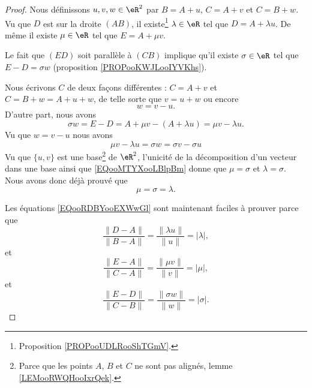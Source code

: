 \begin{proof}
	Nous définissons \( u,v,w\in \eR^2\) par \( B=A+u\), \( C=A+v\) et \( C=B+w\). Vu que \( D\) est sur la droite \( (AB)\), il existe\footnote{Proposition \ref{PROPooUDLRooShTGmV}.} \( \lambda\in \eR\) tel que \( D=A+\lambda u\). De même il existe \( \mu\in \eR\) tel que \( E=A+\mu v\).

	Le fait que \( (ED)\) soit parallèle à \( (CB)\) implique qu'il existe \( \sigma\in \eR\) tel que \( E-D=\sigma w\) (proposition \ref{PROPooKWJLooIYVKhs}).

	Nous écrivons \( C\) de deux façons différentes : \( C=A+v\) et \( C=B+w=A+u+w\), de telle sorte que \( v=u+w\) ou encore
	\begin{equation}
		w=v-u.
	\end{equation}
	D'autre part, nous avons
	\begin{equation}
		\sigma w=E-D=A+\mu v-(A+\lambda u)=\mu v-\lambda u.
	\end{equation}
	Vu que \( w=v-u\) nous avons
	\begin{equation}		\label{EQooMTYXooLBlpBm}
		\mu v-\lambda u=\sigma w=\sigma v-\sigma u
	\end{equation}
	Vu que \( \{ u,v \}\) est une base\footnote{Parce que les points \( A\), \( B\) et \( C\) ne sont pas alignés, lemme \ref{LEMooRWQHooIxrQek}.} de \( \eR^2\), l'unicité de la décomposition d'un vecteur dans une base ainsi que \ref{EQooMTYXooLBlpBm} donne que \( \mu=\sigma\) et \( \lambda=\sigma\). Nous avons donc déjà prouvé que
	\begin{equation}
		\mu=\sigma=\lambda.
	\end{equation}

	Les équations \eqref{EQooRDBYooEXWwGl} sont maintenant faciles à prouver parce que
	\begin{equation}
		\frac{ \| D-A \| }{ \| B-A \| }=\frac{ \| \lambda u \| }{ \| u \| }=| \lambda |,
	\end{equation}
	et
	\begin{equation}
		\frac{ \| E-A \| }{ \| C-A \| }=\frac{ \| \mu v \| }{ \| v \| }=| \mu |,
	\end{equation}
	et
	\begin{equation}
		\frac{ \| E-D \| }{ \| C-B \| }=\frac{ \| \sigma w \| }{ \| w \| }=| \sigma |.
	\end{equation}


\end{proof}
